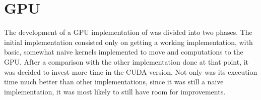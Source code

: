 \section{GPU}
\label{sec:cuda}

The development of a GPU implementation of \polu was divided into two phases. The initial implementation consisted only on getting a working implementation, with basic, somewhat naive kernels implemented to move \computeflux and \update computations to the GPU. After a comparison with the other implementation done at that point, it was decided to invest more time in the CUDA version. Not only was its execution time much better than other implementations, since it was still a naive implementation, it was most likely to still have room for improvements.




